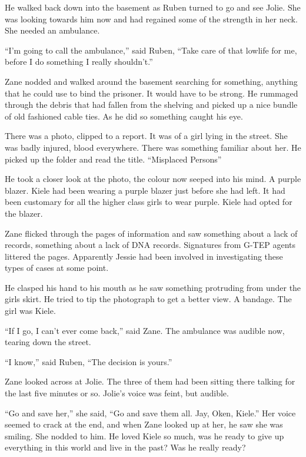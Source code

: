He walked back down into the basement as Ruben turned to go and see Jolie.  She was looking towards him now and had regained some of the strength in her neck.  She needed an ambulance.  

``I'm going to call the ambulance,'' said Ruben, ``Take care of that lowlife for me, before I do something I really shouldn't.''

Zane nodded and walked around the basement searching for something, anything that he could use to bind the prisoner.  It would have to be strong.  He rummaged through the debris that had fallen from the shelving and picked up a nice bundle of old fashioned cable ties.  As he did so something caught his eye.  

There was a photo, clipped to a report.  It was of a girl lying in the street.  She was badly injured, blood everywhere.  There was something familiar about her.  He picked up the folder and read the title.  ``Misplaced Persons''

He took a closer look at the photo, the colour now seeped into his mind.  A purple blazer.  Kiele had been wearing a purple blazer just before she had left.  It had been customary for all the higher class girls to wear purple.  Kiele had opted for the blazer.  

Zane flicked through the pages of information and saw something about a lack of records, something about a lack of DNA records.  Signatures from G-TEP agents littered the pages.  Apparently Jessie had been involved in investigating these types of cases at some point.  

He clasped his hand to his mouth as he saw something protruding from under the girls skirt.  He tried to tip the photograph to get a better view.  A bandage.  The girl was Kiele.  



\thoughtbreak



``If I go, I can't ever come back,'' said Zane.  The ambulance was audible now, tearing down the street.  

``I know,'' said Ruben, ``The decision is yours.''

Zane looked across at Jolie.  The three of them had been sitting there talking for the last five minutes or so.  Jolie's voice was feint, but audible.

``Go and save her,'' she said, ``Go and save them all.  Jay, Oken, Kiele.''  Her voice seemed to crack at the end, and when Zane looked up at her, he saw she was smiling.  She nodded to him.  He loved Kiele so much, was he ready to give up everything in this world and live in the past?  Was he really ready?  

